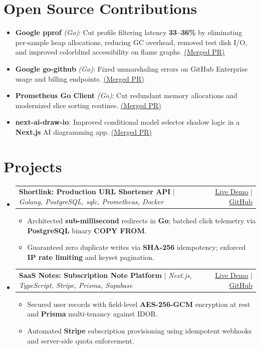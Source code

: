 \documentclass[letterpaper,11pt]{article}
\makeatletter
\newcommand{\resumeItem}[1]{\item\small{#1}}
\newcommand{\resumeProjectHeading}[2]{
  \item
    \begin{tabular*}{\textwidth}{l@{\extracolsep{\fill}}r}
      \small#1 & #2 \\
    \end{tabular*}\vspace{-2pt}
}
\newcommand{\resumeSubHeadingListStart}{\begin{itemize}[leftmargin=0in, label={}, itemsep=0.8pt, parsep=0pt, topsep=0.4pt]}
\newcommand{\resumeSubHeadingListEnd}{\end{itemize}\vspace{-2pt}}
\newcommand{\resumeItemListStart}{\begin{itemize}[leftmargin=12pt, label=\tiny$\bullet$, itemsep=0.8pt, parsep=0pt, topsep=0.4pt]}
\newcommand{\resumeItemListEnd}{\end{itemize}}
\makeatother
\begin{document}
\section{Open Source Contributions}
  \begin{itemize}[leftmargin=12pt, label=\tiny$\bullet$, itemsep=0.5pt, parsep=0pt, topsep=0.3pt]
    \resumeItem{\textbf{Google pprof} \emph{(Go)}: Cut profile filtering latency \textbf{33--36\%} by eliminating per-sample heap allocations, reducing GC overhead, removed test disk I/O, and improved colorblind accessibility on flame graphs. \href{https://github.com/google/pprof/pulls?q=author:kyyril}{\underline{(Merged PR)}}}
    \resumeItem{\textbf{Google go-github} \emph{(Go)}: Fixed unmarshaling errors on GitHub Enterprise usage and billing endpoints. \href{https://github.com/google/go-github/pull/4002}{\underline{(Merged PR)}}}
    \resumeItem{\textbf{Prometheus Go Client} \emph{(Go)}: Cut redundant memory allocations and modernized slice sorting routines. \href{https://github.com/prometheus/client_golang/pull/2176}{\underline{(Merged PR)}}}
    \resumeItem{\textbf{next-ai-draw-io}: Improved conditional model selector shadow logic in a \textbf{Next.js} AI diagramming app. \href{https://github.com/DayuanJiang/next-ai-draw-io/pull/681}{\underline{(Merged PR)}}}
  \end{itemize}\vspace{-2pt}

\section[Projects]{Projects \hfill \normalfont\footnotesize{}}
    \resumeSubHeadingListStart
      \resumeProjectHeading
          {\textbf{Shortlink: Production URL Shortener API} $|$ \emph{Golang, PostgreSQL, sqlc, Prometheus, Docker}}{{\href{https://shortlink-production-1c53.up.railway.app/docs}{\underline{Live Demo}}} $|$ {\href{https://github.com/kyyril/shortlink}{\underline{GitHub}}}}
          \resumeItemListStart
            \resumeItem{Architected \textbf{sub-millisecond} redirects in \textbf{Go}; batched click telemetry via \textbf{PostgreSQL} binary \textbf{COPY FROM}.}
            \resumeItem{Guaranteed zero duplicate writes via \textbf{SHA-256} idempotency; enforced \textbf{IP rate limiting} and keyset pagination.}
          \resumeItemListEnd
      \resumeProjectHeading
          {\textbf{SaaS Notes: Subscription Note Platform} $|$ \emph{Next.js, TypeScript, Stripe, Prisma, Supabase}}{{\href{https://saas-noteapp.vercel.app/}{\underline{Live Demo}}} $|$ {\href{https://github.com/kyyril/saas-noteapp}{\underline{GitHub}}}}
          \resumeItemListStart
            \resumeItem{Secured user records with field-level \textbf{AES-256-GCM} encryption at rest and \textbf{Prisma} multi-tenancy against IDOR.}
            \resumeItem{Automated \textbf{Stripe} subscription provisioning using idempotent webhooks and server-side quota enforcement.}
          \resumeItemListEnd
    \resumeSubHeadingListEnd
\end{document}
